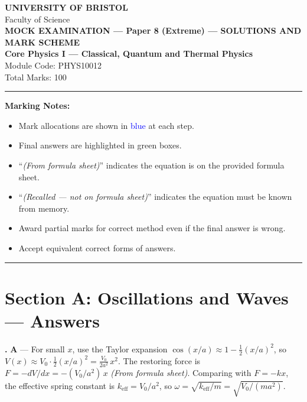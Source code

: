 \documentclass[12pt,a4paper]{article}
\newcommand{\fromsheet}{\textit{(From formula sheet)}}
\newcommand{\recalled}{\textit{(Recalled --- not on formula sheet)}}
\newcounter{mcqcounter}
\newcommand{\mcqanswer}[2]{%
  \stepcounter{mcqcounter}%
  \noindent\textbf{\themcqcounter.} \textbf{#1} --- #2\\[0.2cm]%
}
\begin{document}
\begin{center}
{\Large\textbf{UNIVERSITY OF BRISTOL}}\\[0.3cm]
{\large Faculty of Science}\\[0.5cm]
{\Large\textbf{MOCK EXAMINATION --- Paper 8 (Extreme) --- SOLUTIONS AND MARK SCHEME}}\\[0.3cm]
{\large\textbf{Core Physics I --- Classical, Quantum and Thermal Physics}}\\[0.2cm]
{\large Module Code: PHYS10012}\\[0.5cm]
{\large Total Marks: 100}\\[0.3cm]
\end{center}

\noindent\rule{\textwidth}{0.4pt}

\vspace{0.3cm}
\noindent\textbf{Marking Notes:}
\begin{itemize}[itemsep=0.1cm]
\item Mark allocations are shown in \textcolor{blue}{blue} at each step.
\item Final answers are highlighted in green boxes.
\item ``\fromsheet'' indicates the equation is on the provided formula sheet.
\item ``\recalled'' indicates the equation must be known from memory.
\item Award partial marks for correct method even if the final answer is wrong.
\item Accept equivalent correct forms of answers.
\end{itemize}

\noindent\rule{\textwidth}{0.4pt}
\newpage

\section*{Section A: Oscillations and Waves --- Answers}

\setcounter{mcqcounter}{0}

\mcqanswer{A}{For small $x$, use the Taylor expansion $\cos(x/a) \approx 1 - \frac{1}{2}(x/a)^2$, so $V(x) \approx V_0 \cdot \frac{1}{2}(x/a)^2 = \frac{V_0}{2a^2}\,x^2$. The restoring force is $F = -dV/dx = -(V_0/a^2)\,x$ \fromsheet. Comparing with $F = -kx$, the effective spring constant is $k_\text{eff} = V_0/a^2$, so $\omega = \sqrt{k_\text{eff}/m} = \sqrt{V_0/(ma^2)}$.}
\end{document}
